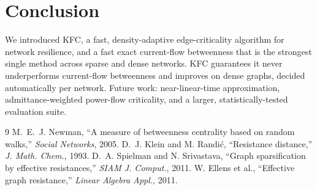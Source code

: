 \documentclass[11pt]{article}
\begin{document}
\section{Conclusion}
We introduced KFC, a fast, density-adaptive edge-criticality algorithm for network
resilience, and a fast exact current-flow betweenness that is the strongest single
method across sparse and dense networks. KFC guarantees it never underperforms
current-flow betweenness and improves on dense graphs, decided automatically per network.
Future work: near-linear-time approximation, admittance-weighted power-flow criticality,
and a larger, statistically-tested evaluation suite.

\begin{thebibliography}{9}
 M.~E.~J. Newman, ``A measure of betweenness centrality based on random walks,'' \emph{Social Networks}, 2005.
 D.~J. Klein and M. Randi\'c, ``Resistance distance,'' \emph{J. Math. Chem.}, 1993.
 D.~A. Spielman and N. Srivastava, ``Graph sparsification by effective resistances,'' \emph{SIAM J. Comput.}, 2011.
 W. Ellens et al., ``Effective graph resistance,'' \emph{Linear Algebra Appl.}, 2011.
\end{thebibliography}
\end{document}
